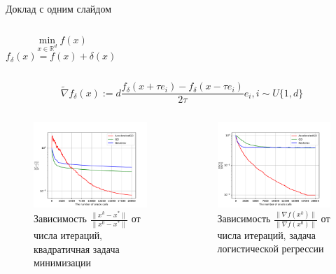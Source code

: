 \documentclass{beamer}
\begin{document}
\begin{frame}{Доклад с одним слайдом}

\begin{columns}[c]
    $$\min\limits_{x \in \mathbb{R}^d} f(x)$$
    $$f_\delta (x) = f(x) + \delta (x)$$
\end{columns}

$$\widetilde{\nabla} f_\delta (x) := d\frac{f_\delta (x + \tau e_i) - f_\delta (x - \tau e_i)}{2\tau} e_i, i \sim U\{1, d\}$$

\begin{columns}[c]
    \begin{figure}
    \includegraphics[width=1.0\textwidth]{Deterministic_quadratic_AGD_GD_Nesterov_18.pdf}
        \caption*{Зависимость $\frac{\|x^k - x^*\|}{\|x^0 - x^*\|}$ от числа итераций, квадратичная задача минимизации}
    \end{figure}

    \begin{figure}
    \includegraphics[width=1.0\textwidth]{Non_stochastic_Logreg_AGD_GD_Nesterov_18_1e-06_0.0001.pdf}
        \caption*{Зависимость $\frac{\|\nabla f(x^k)\|}{\|\nabla f(x^0)\|}$ от числа итераций, задача логистической регрессии}
    \end{figure}
\end{columns}


\end{frame}
\end{document}

